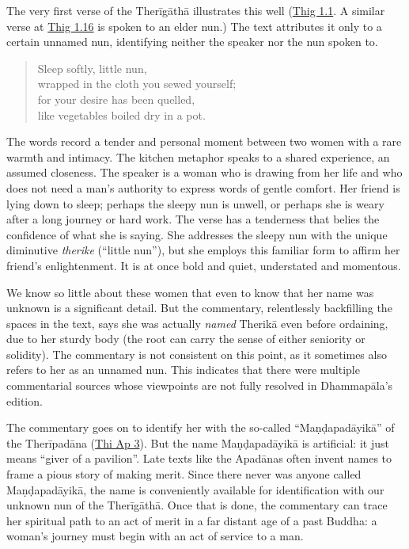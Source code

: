 \documentclass[12pt,openany]{book}%
\begin{document}
The very first verse of the \textsanskrit{Therīgāthā} illustrates this well (\href{https://suttacentral.net/thig1.1}{Thig 1.1}. A similar verse at \href{https://suttacentral.net/thig1.16}{Thig 1.16} is spoken to an elder nun.) The text attributes it only to a certain unnamed nun, identifying neither the speaker nor the nun spoken to.

\begin{verse}%
Sleep softly, little nun, \\
wrapped in the cloth you sewed yourself; \\
for your desire has been quelled, \\
like vegetables boiled dry in a pot.

%
\end{verse}

The words record a tender and personal moment between two women with a rare warmth and intimacy. The kitchen metaphor speaks to a shared experience, an assumed closeness. The speaker is a woman who is drawing from her life and who does not need a man’s authority to express words of gentle comfort. Her friend is lying down to sleep; perhaps the sleepy nun is unwell, or perhaps she is weary after a long journey or hard work. The verse has a tenderness that belies the confidence of what she is saying. She addresses the sleepy nun with the unique diminutive \textit{therike} (“little nun”), but she employs this familiar form to affirm her friend’s enlightenment. It is at once bold and quiet, understated and momentous.

We know so little about these women that even to know that her name was unknown is a significant detail. But the commentary, relentlessly backfilling the spaces in the text, says she was actually \emph{named} \textsanskrit{Therikā} even before ordaining, due to her sturdy body (the root can carry the sense of either seniority or solidity). The commentary is not consistent on this point, as it sometimes also refers to her as an unnamed nun. This indicates that there were multiple commentarial sources whose viewpoints are not fully resolved in \textsanskrit{Dhammapāla}’s edition.

The commentary goes on to identify her with the so-called “\textsanskrit{Maṇḍapadāyikā}” of the \textsanskrit{Therīpadāna} (\href{https://suttacentral.net/thi-ap3}{Thi Ap 3}). But the name \textsanskrit{Maṇḍapadāyikā} is artificial: it just means “giver of a pavilion”. Late texts like the \textsanskrit{Apadānas} often invent names to frame a pious story of making merit. Since there never was anyone called \textsanskrit{Maṇḍapadāyikā}, the name is conveniently available for identification with our unknown nun of the \textsanskrit{Therīgāthā}. Once that is done, the commentary can trace her spiritual path to an act of merit in a far distant age of a past Buddha: a woman’s journey must begin with an act of service to a man.
\end{document}
